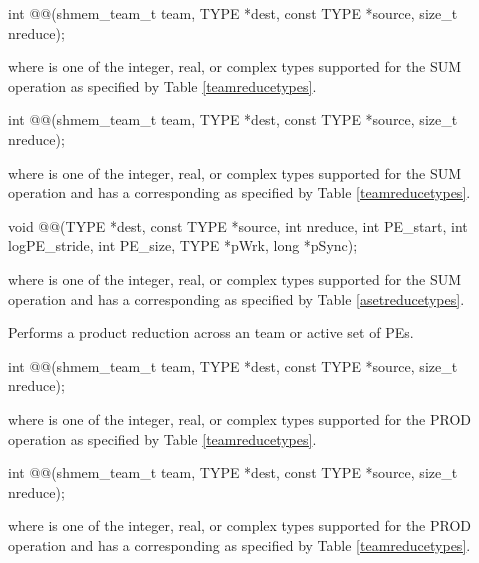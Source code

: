 \begin{apidefinition}
\begin{C11synopsis}
int @@(shmem_team_t team, TYPE *dest, const TYPE *source, size_t nreduce);
\end{C11synopsis}
where \TYPE{} is one of the integer, real, or complex types supported for the SUM operation as specified by Table \ref{teamreducetypes}.

\begin{Csynopsis}
\end{Csynopsis}

\begin{CsynopsisCol}
int @@(shmem_team_t team, TYPE *dest, const TYPE *source, size_t nreduce);
\end{CsynopsisCol}
where \TYPE{} is one of the integer, real, or complex types supported for the SUM operation and has a corresponding \TYPENAME{} as specified by Table \ref{teamreducetypes}.

\begin{DeprecateBlock}
\begin{CsynopsisCol}
void @@(TYPE *dest, const TYPE *source, int nreduce, int PE_start, int logPE_stride, int PE_size, TYPE *pWrk, long *pSync);
\end{CsynopsisCol}
\end{DeprecateBlock}
where \TYPE{} is one of the integer, real, or complex types supported for the SUM operation and has a corresponding \TYPENAME{} as specified by Table \ref{asetreducetypes}.

\label{subsec:shmem_prod_reduce}
Performs a product reduction across an \openshmem team or active set of \acp{PE}.\newline

\begin{C11synopsis}
int @@(shmem_team_t team, TYPE *dest, const TYPE *source, size_t nreduce);
\end{C11synopsis}
where \TYPE{} is one of the integer, real, or complex types supported for the PROD operation as specified by Table \ref{teamreducetypes}.

\begin{Csynopsis}
\end{Csynopsis}

\begin{CsynopsisCol}
int @@(shmem_team_t team, TYPE *dest, const TYPE *source, size_t nreduce);
\end{CsynopsisCol}
where \TYPE{} is one of the integer, real, or complex types supported for the PROD operation and has a corresponding \TYPENAME{} as specified by Table \ref{teamreducetypes}.


\end{apidefinition}
